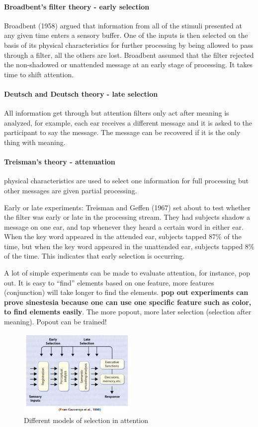 \documentclass[12pt,article,oneside,a4paper]{memoir}
\begin{document}
\paragraph{Broadbent's filter theory - early selection} Broadbent (1958) argued that information from all of the stimuli presented at any given time enters a sensory buffer.  One of the inputs is then selected on the basis of its physical characteristics for further processing by being allowed to pass through a filter, all the others are lost.  Broadbent assumed that the filter rejected the non-shadowed or unattended message at an early stage of processing. It takes time to shift attention.

\paragraph{Deutsch and Deutsch theory - late selection} All information get through but attention filters only act after meaning is analyzed, for example, each ear receives a different message and it is asked to the participant to say the message. The message can be recovered if it is the only thing with meaning.

\paragraph{Treisman's theory - attenuation} physical characteristics are used to select one information for full processing but other messages are given partial processing. 

Early or late experiments: Treisman and Geffen (1967) set about to test whether the filter was early or late in the processing stream. They had subjects shadow a message on one ear, and tap whenever they heard a certain word in either ear. When the key word appeared in the attended ear, subjects tapped 87\% of the time, but when the key word appeared in the unattended ear, subjects tapped 8\% of the time. This indicates that early selection is occurring.

A lot of simple experiments can be made to evaluate attention, for instance, pop out. It is easy to ``find'' elements based on one feature, more features (conjunction) will take longer to find the elements. \textbf{pop out experiments can prove sinestesia because one can use one specific feature such as color, to find elements easily}. The more popout, more later selection (selection after meaning). Popout can be trained!

\begin{figure}[h]
  \centering
  \includegraphics[width=0.5\textwidth]{imgs/early-late-selection.png}
  \caption{Different models of selection in attention}
  \label{fig:early-late-selection}
\end{figure}
\end{document}
